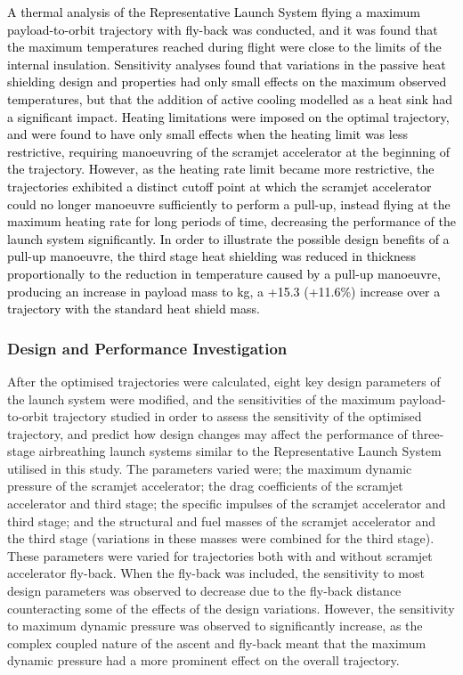  \textcolor{black}{A thermal analysis of the Representative Launch System flying a maximum payload-to-orbit trajectory with fly-back was conducted, and it was found that the maximum temperatures reached during flight were close to the limits of the internal insulation. Sensitivity analyses found that variations in the passive heat shielding design and properties had only small effects on the maximum observed temperatures, but that the addition of active cooling modelled as a heat sink had a significant impact. 
 	Heating limitations were imposed on the optimal trajectory, and were found to have only small effects when the heating limit was less restrictive, requiring manoeuvring of the scramjet accelerator at the beginning of the trajectory. However, as the heating rate limit became more restrictive, the trajectories exhibited a distinct cutoff point at which the scramjet accelerator could no longer manoeuvre sufficiently to perform a pull-up, instead flying at the maximum heating rate for long periods of time, decreasing the performance of the launch system significantly. 
 	In order to illustrate the possible design benefits of a pull-up manoeuvre, the third stage heat shielding was reduced in thickness proportionally to the reduction in temperature caused by a pull-up manoeuvre, producing an increase in payload mass to \PayloadToOrbitTPSreduced kg, a +15.3 (+11.6\%) increase over a trajectory with the standard heat shield mass.}
	
	\subsubsection{Design and Performance Investigation}
After the optimised trajectories were calculated, eight key design parameters of the launch system were modified, and the sensitivities of the maximum payload-to-orbit trajectory studied in order to assess the sensitivity of the optimised trajectory, and predict how design changes may affect the performance of three-stage airbreathing launch systems similar to the Representative Launch System utilised in this study.
The parameters varied were; the maximum dynamic pressure of the scramjet accelerator; the drag coefficients of the scramjet accelerator and third stage; the specific impulses of the scramjet accelerator and third stage; and the structural and fuel masses of the scramjet accelerator and the third stage (variations in these masses were combined for the third stage). 
These parameters were varied for trajectories both with and without scramjet accelerator fly-back. When the fly-back was included, the sensitivity to most design parameters was observed to decrease due to the fly-back distance counteracting some of the effects of the design variations. However, the sensitivity to maximum dynamic pressure was observed to significantly increase, as the complex coupled nature of the ascent and fly-back meant that the maximum dynamic pressure had a more prominent effect on the overall trajectory. 

